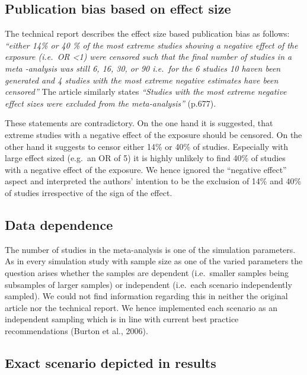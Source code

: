 \documentclass[
  english,
  doc,floatsintext,draftall]{apa6}
\begin{document}
\hypertarget{publication-bias-based-on-effect-size}{%
\subsection{Publication bias based on effect size}\label{publication-bias-based-on-effect-size}}

The technical report describes the effect size based publication bias as follows:
\emph{\enquote{either 14\% or 40 \% of the most extreme studies showing a negative effect of the exposure (i.e.~OR \textless1) were censored such that the final number of studies in a meta -analysis was still 6, 16, 30, or 90 i.e.~for the 6 studies 10 haven been generated and 4 studies with the most extreme negative estimates have been censored}} The article similarly states \emph{\enquote{Studies with the most extreme negative effect sizes were excluded from the meta-analysis}} (p.677).

These statements are contradictory.
On the one hand it is suggested, that extreme studies with a negative effect of the exposure should be censored.
On the other hand it suggests to censor either 14\% or 40\% of studies.
Especially with large effect sized (e.g.~an OR of 5) it is highly unlikely to find 40\% of studies with a negative effect of the exposure.
We hence ignored the \enquote{negative effect} aspect and interpreted the authors' intention to be the exclusion of 14\% and 40\% of studies irrespective of the sign of the effect.

\hypertarget{data-dependence}{%
\subsection{Data dependence}\label{data-dependence}}

The number of studies in the meta-analysis is one of the simulation parameters.
As in every simulation study with sample size as one of the varied parameters the question arises whether the samples are dependent (i.e.~smaller samples being subsamples of larger samples) or independent (i.e.~each scenario independently sampled).
We could not find information regarding this in neither the original article nor the technical report.
We hence implemented each scenario as an independent sampling which is in line with current best practice recommendations (Burton et al., 2006).

\hypertarget{exact-scenario-depicted-in-results}{%
\subsection{Exact scenario depicted in results}\label{exact-scenario-depicted-in-results}}
\end{document}
